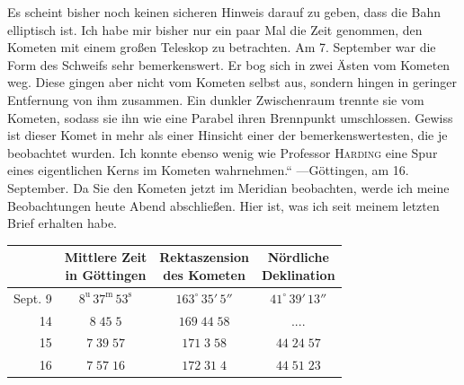 \par\indent Es scheint bisher noch keinen sicheren Hinweis darauf zu geben, dass die Bahn elliptisch ist. Ich habe mir bisher nur ein paar Mal die Zeit genommen, den Kometen mit einem großen Teleskop zu betrachten. Am 7. September war die Form des Schweifs sehr bemerkenswert. Er bog sich in zwei Ästen vom Kometen weg. Diese gingen aber nicht vom Kometen selbst aus, sondern hingen in geringer Entfernung von ihm zusammen. Ein dunkler Zwischenraum trennte sie vom Kometen, sodass sie ihn wie eine Parabel ihren Brennpunkt umschlossen. Gewiss ist dieser Komet in mehr als einer Hinsicht einer der bemerkenswertesten, die je beobachtet wurden. Ich konnte ebenso wenig wie Professor \textsc{Harding} eine Spur eines eigentlichen Kerns im Kometen wahrnehmen.“ ---\quad Göttingen, am 16. September. Da Sie den Kometen jetzt im Meridian beobachten, werde ich meine Beobachtungen heute Abend abschließen. Hier ist, was ich seit meinem letzten Brief erhalten habe.
\begin{center}\fontsize{10}{12}\selectfont\setlength{\tabcolsep}{4pt}\renewcommand{\arraystretch}{1.15}\begin{tabular}{r|c|c|c}
 & \shortstack{Mittlere Zeit\\in Göttingen} & \shortstack{Rektaszension\\des Kometen} & \shortstack{Nördliche\\Deklination}\\\hline
Sept. 9 & $8^{\mathrm u}\,37^{\mathrm m}\,53^{\mathrm s}$ & $163^\circ\,35'\,5''$ & $41^\circ\,39'\,13''$\\
14 & $8\;45\;5$ & $169\;44\;58$ & .\quad.\quad.\quad.\\
15 & $7\;39\;57$ & $171\;3\;58$ & $44\;24\;57$\\
16 & $7\;57\;16$ & $172\;31\;4$ & $44\;51\;23$\\
\end{tabular}\end{center}

